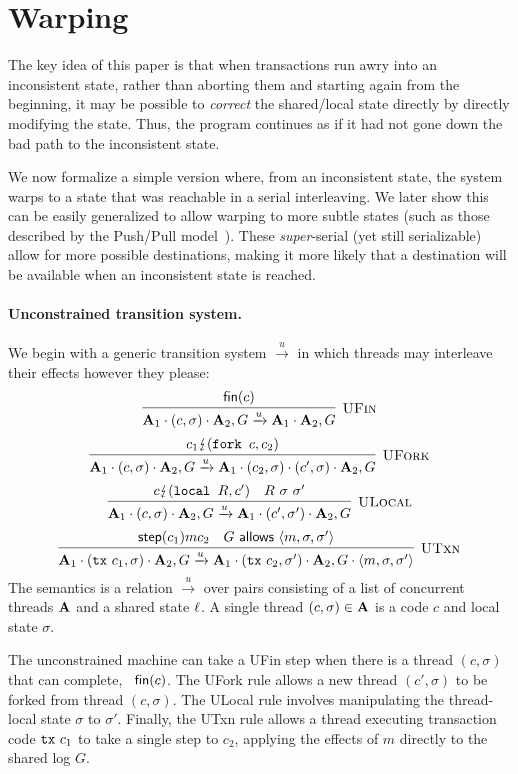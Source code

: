 \section{Warping}
\label{sect:warping}

The key idea of this paper is that when transactions run
awry into an inconsistent state, rather than aborting them and
starting again from the beginning, it may be possible to
\emph{correct} the shared/local state directly by directly
modifying the state. Thus, the program continues as if it had not
gone down the bad path to the inconsistent state.

We now formalize a simple version where, from an inconsistent state,
the system warps to a state that was reachable in a serial
interleaving. We later show this can be easily generalized to allow
warping to more subtle states (such as those described by the
Push/Pull model~\cite{}). These \emph{super}-serial (yet still
serializable) allow for more possible destinations, making it more
likely that a destination will be available when an inconsistent state
is reached.


\paragraph{Unconstrained transition system.}

We begin with a generic transition system $\xrightarrow{u}$ in which threads may
interleave their effects however they please:
$$
\infer[\text{\sc UFin}]{ 
  \As_1 \cdot (c,\sigma) \cdot \As_2, G  \xrightarrow{u}
  \As_1 \cdot \As_2, G 
}{
  \nothing{c}
}
$$
$$
\infer[\text{\sc UFork}]{ 
  \As_1 \cdot (c,\sigma) \cdot \As_2, G  \xrightarrow{u}
  \As_1 \cdot (c_2,\sigma) \cdot (c',\sigma) \cdot \As_2, G 
}{
  \tstep{c_1}{\fork{c}}{c_2}
}
$$
$$
\infer[\text{\sc ULocal}]{ 
  \As_1 \cdot (c,\sigma) \cdot \As_2, G  \xrightarrow{u}
  \As_1 \cdot (c',\sigma') \cdot \As_2, G 
}{
  \tstep{c}{\local{R}}{c'} & R\ \sigma\ \sigma'
}
$$
$$
\infer[\text{\sc UTxn}]{ 
  \As_1 \cdot (\tx{c_1},\sigma) \cdot \As_2, G  \xrightarrow{u}
  \As_1 \cdot (\tx{c_2},\sigma') \cdot \As_2, G\cdot \langle m,\sigma,\sigma' \rangle
}{
  \step{c_1}{m}{c_2} &
  G \allows \langle m,\sigma,\sigma' \rangle
}
$$
The semantics is a relation
$\xrightarrow{u}$ over pairs consisting of a list of concurrent
threads $\mathbf{A}$ and a shared state $\ell$. 
A single thread $(c,\sigma)\in\mathbf{A}$ is a code $c$ and local state $\sigma$. 

The unconstrained machine can take a {\sc UFin} step when there is a thread
$(c,\sigma)$ that can complete, \ie~$\textsf{fin}(c)$.
%
The {\sc UFork} rule allows a new thread
$(c',\sigma)$ to be forked from thread $(c,\sigma)$.
%
The {\sc ULocal} rule involves manipulating the thread-local state
$\sigma$ to $\sigma'$.
%
Finally, the {\sc UTxn} rule allows a thread executing transaction
code $\texttt{tx}\ c_1$ to take a single step to $c_2$, applying the effects
of $m$ directly to the shared log $G$.

